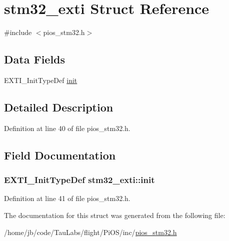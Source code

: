 \hypertarget{structstm32__exti}{\section{stm32\-\_\-exti \-Struct \-Reference}
\label{structstm32__exti}
}


{\ttfamily \#include $<$pios\-\_\-stm32.\-h$>$}

\subsection*{\-Data \-Fields}
\begin{DoxyCompactItemize}
\item 
\-E\-X\-T\-I\-\_\-\-Init\-Type\-Def \hyperlink{structstm32__exti_a87f2c25add68d3308e34a4a5b8facd30}{init}
\end{DoxyCompactItemize}


\subsection{\-Detailed \-Description}


\-Definition at line 40 of file pios\-\_\-stm32.\-h.



\subsection{\-Field \-Documentation}
\hypertarget{structstm32__exti_a87f2c25add68d3308e34a4a5b8facd30}{
\subsubsection[{init}]{\setlength{\rightskip}{0pt plus 5cm}\-E\-X\-T\-I\-\_\-\-Init\-Type\-Def {\bf stm32\-\_\-exti\-::init}}}\label{structstm32__exti_a87f2c25add68d3308e34a4a5b8facd30}


\-Definition at line 41 of file pios\-\_\-stm32.\-h.



\-The documentation for this struct was generated from the following file\-:\begin{DoxyCompactItemize}
\item 
/home/jb/code/\-Tau\-Labs/flight/\-Pi\-O\-S/inc/\hyperlink{pios__stm32_8h}{pios\-\_\-stm32.\-h}\end{DoxyCompactItemize}
